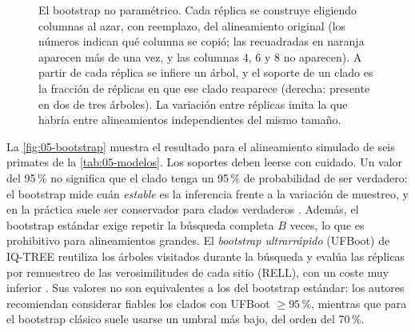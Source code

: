 \begin{figure}[t]
\centering
\hspace{4mm}%
\caption[Esquema del bootstrap no paramétrico]{El bootstrap no paramétrico. Cada réplica se construye eligiendo columnas al azar, con reemplazo, del alineamiento original (los números indican qué columna se copió; las recuadradas en naranja aparecen más de una vez, y las columnas 4, 6 y 8 no aparecen). A partir de cada réplica se infiere un árbol, y el soporte de un clado es la fracción de réplicas en que ese clado reaparece (derecha: presente en dos de tres árboles). La variación entre réplicas imita la que habría entre alineamientos independientes del mismo tamaño.}
\label{fig:05-bootstrap-esquema}
\end{figure}

La \cref{fig:05-bootstrap} muestra el resultado para el alineamiento simulado de seis primates de la \cref{tab:05-modelos}. Los soportes deben leerse con cuidado. Un valor del 95\,\% no significa que el clado tenga un 95\,\% de probabilidad de ser verdadero: el bootstrap mide cuán \emph{estable} es la inferencia frente a la variación de muestreo, y en la práctica suele ser conservador para clados verdaderos \parencite{c05-felsenstein2004}. Además, el bootstrap estándar exige repetir la búsqueda completa $B$ veces, lo que es prohibitivo para alineamientos grandes. El \emph{bootstrap ultrarrápido} (UFBoot) de IQ-TREE reutiliza los árboles visitados durante la búsqueda y evalúa las réplicas por remuestreo de las verosimilitudes de cada sitio (RELL), con un coste muy inferior \parencite{c05-hoang2018}. Sus valores no son equivalentes a los del bootstrap estándar: los autores recomiendan considerar fiables los clados con UFBoot $\ge 95\,\%$, mientras que para el bootstrap clásico suele usarse un umbral más bajo, del orden del 70\,\%.

